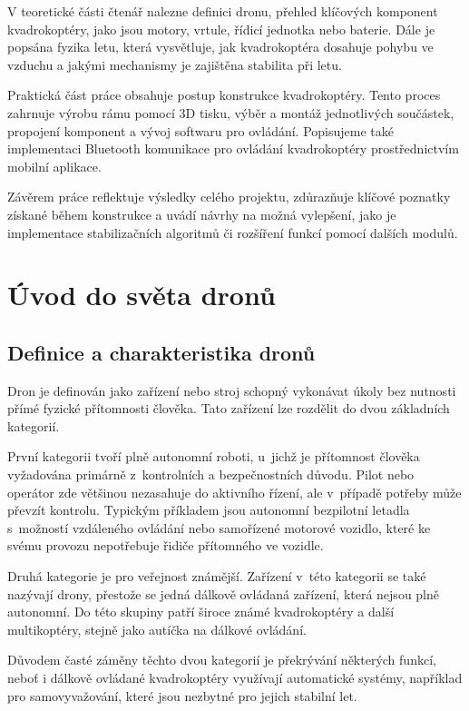 \documentclass[12pt]{report}
\begin{document}
V teoretické části čtenář nalezne definici dronu, přehled klíčových komponent kvadrokoptéry, jako jsou motory, vrtule, řídicí jednotka nebo baterie. Dále je popsána fyzika letu, která vysvětluje, jak kvadrokoptéra dosahuje pohybu ve vzduchu a jakými mechanismy je zajištěna stabilita při letu.

Praktická část práce obsahuje postup konstrukce kvadrokoptéry. Tento proces zahrnuje výrobu rámu pomocí 3D tisku, výběr a montáž jednotlivých součástek, propojení komponent a vývoj softwaru pro ovládání. Popisujeme také implementaci Bluetooth komunikace pro ovládání kvadrokoptéry prostřednictvím mobilní aplikace.

Závěrem práce reflektuje výsledky celého projektu, zdůrazňuje klíčové poznatky získané během konstrukce a uvádí návrhy na možná vylepšení, jako je implementace stabilizačních algoritmů či rozšíření funkcí pomocí dalších modulů.
\part[Úvod do světa dronů]{Úvod do světa dronů}  %

\chapter[Definice a charakteristika dronů]{Definice a charakteristika dronů}

Dron je definován jako zařízení nebo stroj schopný vykonávat úkoly bez nutnosti přímé fyzické přítomnosti člověka. Tato zařízení lze rozdělit do dvou základních kategorií.

První kategorii tvoří plně autonomní roboti, u~jichž je přítomnost člověka vyžadována primárně z~kontrolních a bezpečnostních důvodu. Pilot nebo operátor zde většinou nezasahuje do aktivního řízení, ale v~případě potřeby může převzít kontrolu. Typickým příkladem jsou autonomní bezpilotní letadla s~možností vzdáleného ovládání nebo samořízené motorové vozidlo, které ke svému provozu nepotřebuje řidiče přítomného ve vozidle.

Druhá kategorie je pro veřejnost známější. Zařízení v~této kategorii se také nazývají drony, přestože se jedná dálkově ovládaná zařízení, která nejsou plně autonomní. Do této skupiny patří široce známé kvadrokoptéry a další multikoptéry, stejně jako autíčka na dálkové ovládání.

Důvodem časté záměny těchto dvou kategorií je překrývání některých funkcí, neboť i dálkově ovládané kvadrokoptéry využívají automatické systémy, například pro samovyvažování, které jsou nezbytné pro jejich stabilní let.\cite{mainbook}
\end{document}
